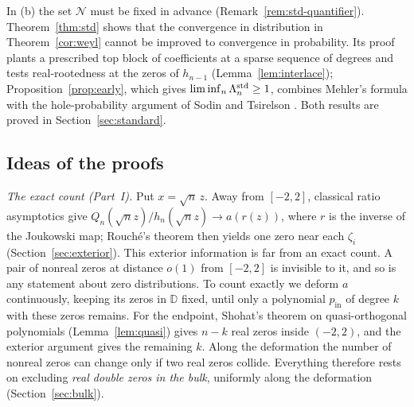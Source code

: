 \documentclass[11pt]{amsart}
\theoremstyle{definition}
\theoremstyle{remark}
\numberwithin{equation}{section}
\newcommand{\D}{\mathbb{D}}
\begin{document}
In (b) the set $\mathcal N$ must be fixed in advance (Remark~\ref{rem:std-quantifier}). Theorem~\ref{thm:std} shows that the convergence in distribution in Theorem~\ref{cor:weyl} cannot be improved to convergence in probability. Its proof plants a prescribed top block of coefficients at a sparse sequence of degrees and tests real-rootedness at the zeros of $h_{n-1}$ (Lemma~\ref{lem:interlace}); Proposition~\ref{prop:early}, which gives $\liminf_n\Lambda_n^{\rm std}\ge1$, combines Mehler's formula with the hole-probability argument of Sodin and Tsirelson \cite{ST}. Both results are proved in Section~\ref{sec:standard}.

\subsection{Ideas of the proofs}\label{sec:idea}
\emph{The exact count (Part~I).} Put $x=\sqrt n\,z$. Away from $[-2,2]$, classical ratio asymptotics give $Q_n(\sqrt n z)/h_n(\sqrt n z)\to a(r(z))$, where $r$ is the inverse of the Joukowski map; Rouch\'e's theorem then yields one zero near each $\zeta_i$ (Section~\ref{sec:exterior}). This exterior information is far from an exact count. A pair of nonreal zeros at distance $o(1)$ from $[-2,2]$ is invisible to it, and so is any statement about zero distributions. To count exactly we deform $a$ continuously, keeping its zeros in $\D$ fixed, until only a polynomial $p_{\mathrm{in}}$ of degree $k$ with these zeros remains. For the endpoint, Shohat's theorem on quasi-orthogonal polynomials (Lemma~\ref{lem:quasi}) gives $n-k$ real zeros inside $(-2,2)$, and the exterior argument gives the remaining $k$. Along the deformation the number of nonreal zeros can change only if two real zeros collide. Everything therefore rests on excluding \emph{real double zeros in the bulk}, uniformly along the deformation (Section~\ref{sec:bulk}).
\end{document}
